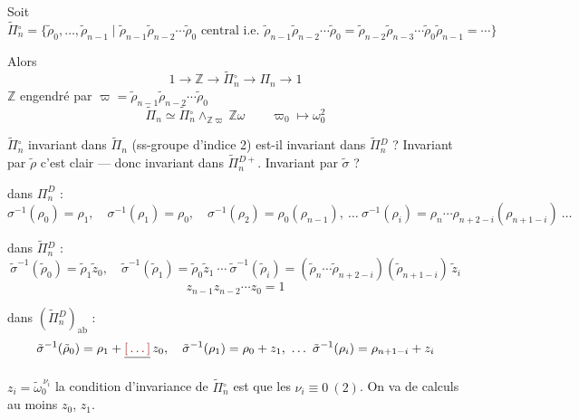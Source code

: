 \documentclass[11pt,a4paper]{article}
\begin{document}
Soit
\[
\widetilde{\Pi}{}^{\circ}_n = \{\tilde\rho_0, \ldots, \tilde\rho_{n-1} \mid
\tilde\rho_{n-1}\tilde\rho_{n-2}\cdots\tilde\rho_0 \text{ central i.e. }
\tilde\rho_{n-1}\tilde\rho_{n-2}\cdots\tilde\rho_0
= \tilde\rho_{n-2}\tilde\rho_{n-3}\cdots\tilde\rho_0\tilde\rho_{n-1} = \cdots\}
\]

Alors
\[
1 \to \mathbb{Z} \to \widetilde{\Pi}{}^{\circ}_n \to \Pi_n \to 1
\]
$\mathbb{Z}$ engendré par $\varpi = \tilde\rho_{n-1}\tilde\rho_{n-2}\cdots\tilde\rho_0$
\[
\widetilde{\Pi}_n \simeq \widetilde{\Pi}{}^{\circ}_n \wedge_{\mathbb{Z}\varpi} \mathbb{Z}\omega
\qquad \varpi_0 \longmapsto \omega_0^{2}
\]



$\widetilde{\Pi}{}^{\circ}_n$ invariant dans $\widetilde{\Pi}_n$ (ss-groupe
d'indice 2) est-il invariant
dans $\widetilde{\Pi}{}^{D}_n$ ? Invariant par $\tilde\rho$ c'est clair --- donc
invariant dans $\widetilde{\Pi}{}^{D+}_n$. Invariant par $\tilde\sigma$ ?


dans $\Pi^D_n$ :
\[
\sigma^{-1}(\rho_0) = \rho_1,\quad \sigma^{-1}(\rho_1) = \rho_0,\quad
\sigma^{-1}(\rho_2) = \rho_0(\rho_{n-1}),\ \ldots\
\sigma^{-1}(\rho_i) = \rho_n\cdots\rho_{n+2-i}(\rho_{n+1-i})\ \ldots
\]

dans $\widetilde{\Pi}{}^{D}_n$ :
\[
\tilde\sigma^{-1}(\tilde\rho_0) = \tilde\rho_1\tilde z_0,\quad
\tilde\sigma^{-1}(\tilde\rho_1) = \tilde\rho_0\tilde z_1\ \cdots\
\tilde\sigma^{-1}(\tilde\rho_i) = (\tilde\rho_n\cdots\tilde\rho_{n+2-i})(\tilde\rho_{n+1-i})\,\tilde z_i
\]
\[
z_{n-1}z_{n-2}\cdots z_0 = 1
\]

dans $(\widetilde{\Pi}{}^{D}_n)_{\mathrm{ab}}$ :
\[
\tilde\sigma^{-1}(\tilde\rho_0) = \rho_1 + \struck{\ill{}}\, z_0,\quad
\tilde\sigma^{-1}(\rho_1) = \rho_0 + z_1,\ \ldots\
\tilde\sigma^{-1}(\rho_i) = \rho_{n+1-i} + z_i
\]


$z_i = \tilde\omega_0^{\,\nu_i}$ la condition d'invariance de
$\widetilde{\Pi}{}^{\circ}_n$ est que les $\nu_i \equiv 0\ (2)$. On va \ill{}
de \struck{\ill{}} calculs au moins $z_0$, $z_1$.
\end{document}
